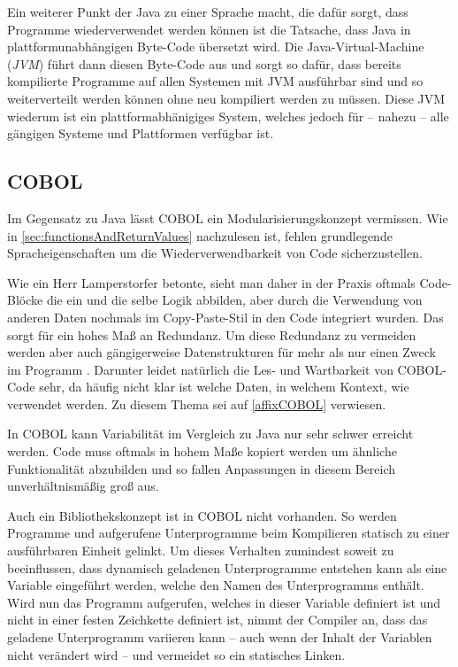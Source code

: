Ein weiterer Punkt der Java zu einer Sprache macht, die dafür sorgt, dass Programme wiederverwendet werden können ist die Tatsache, dass Java in plattformunabhängigen Byte-Code übersetzt wird. Die Java-Virtual-Machine (\textit{JVM}) führt dann diesen Byte-Code aus und sorgt so dafür, dass bereits kompilierte Programme auf allen Systemen mit JVM ausführbar sind und so weiterverteilt werden können ohne neu kompiliert werden zu müssen. Diese JVM wiederum ist ein plattformabhänigiges System, welches jedoch für -- nahezu -- alle gängigen Systeme und Plattformen verfügbar ist.

\subsection*{COBOL}
Im Gegensatz zu Java lässt COBOL ein Modularisierungskonzept vermissen. Wie in \autoref{sec:functionsAndReturnValues} nachzulesen ist, fehlen grundlegende Spracheigenschaften um die Wiederverwendbarkeit von Code sicherzustellen. 

Wie ein Herr Lamperstorfer betonte, sieht man daher in der Praxis oftmals Code-Blöcke die ein und die selbe Logik abbilden, aber durch die Verwendung von anderen Daten nochmals im Copy-Paste-Stil in den Code integriert wurden. Das sorgt für ein hohes Maß an Redundanz. Um diese Redundanz zu vermeiden werden aber auch gängigerweise Datenstrukturen für mehr als nur einen Zweck im Programm . Darunter leidet natürlich die Les- und Wartbarkeit von COBOL-Code sehr, da häufig nicht klar ist welche Daten, in welchem Kontext, wie verwendet werden. Zu diesem Thema sei auf \autoref{affixCOBOL} verwiesen.

In COBOL kann Variabilität im Vergleich zu Java nur sehr schwer erreicht werden. Code muss oftmals in hohem Maße kopiert werden um ähnliche Funktionalität abzubilden und so fallen Anpassungen in diesem Bereich unverhältnismäßig groß aus.

Auch ein Bibliothekskonzept ist in COBOL nicht vorhanden. So werden Programme und aufgerufene Unterprogramme beim Kompilieren statisch zu einer ausführbaren Einheit gelinkt. Um dieses Verhalten zumindest soweit zu beeinflussen, dass dynamisch geladenen Unterprogramme entstehen kann als  eine Variable eingeführt werden, welche den Namen des Unterprogramms enthält. Wird nun das Programm aufgerufen, welches in dieser Variable definiert ist und nicht in einer festen Zeichkette definiert ist, nimmt der Compiler an, dass das geladene Unterprogramm variieren kann -- auch wenn der Inhalt der Variablen nicht verändert wird -- und vermeidet so ein statisches Linken.

